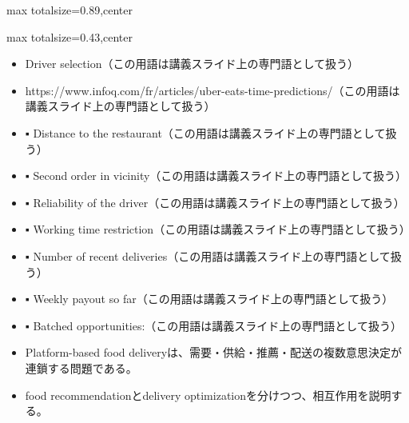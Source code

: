 \begin{minipage}[t]{0.58\textwidth}
\begin{adjustbox}{max totalsize={\textwidth}{0.89\textheight},center}
\begin{minipage}{\textwidth}
\end{minipage}
\end{adjustbox}
\end{minipage}


\clearpage
{}
\begin{minipage}[t]{0.405\textwidth}
\begin{adjustbox}{max totalsize={\textwidth}{0.43\textheight},center}
\begin{minipage}{\textwidth}\scriptsize
{}\begin{itemize}
\item Driver selection（この用語は講義スライド上の専門語として扱う）
\item https://www.infoq.com/fr/articles/uber-eats-time-predictions/（この用語は講義スライド上の専門語として扱う）
\item ▪ Distance to the restaurant（この用語は講義スライド上の専門語として扱う）
\item ▪ Second order in vicinity（この用語は講義スライド上の専門語として扱う）
\item ▪ Reliability of the driver（この用語は講義スライド上の専門語として扱う）
\item ▪ Working time restriction（この用語は講義スライド上の専門語として扱う）
\item ▪ Number of recent deliveries（この用語は講義スライド上の専門語として扱う）
\item ▪ Weekly payout so far（この用語は講義スライド上の専門語として扱う）
\item ▪ Batched opportunities:（この用語は講義スライド上の専門語として扱う）
\end{itemize}\begin{itemize}
\item Platform-based food deliveryは、需要・供給・推薦・配送の複数意思決定が連鎖する問題である。
\item food recommendationとdelivery optimizationを分けつつ、相互作用を説明する。
\end{itemize}
\end{minipage}
\end{adjustbox}
\end{minipage}\hfill
